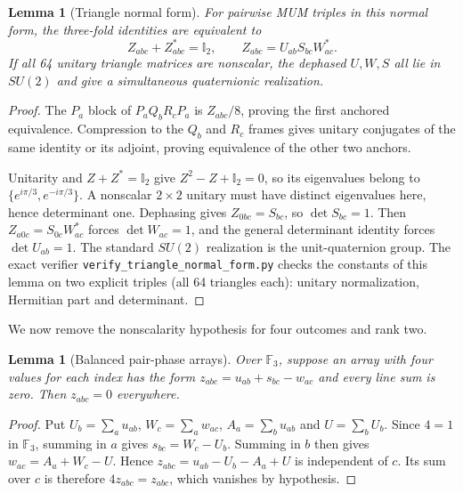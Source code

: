 \documentclass[11pt]{article}
\newtheorem{lemma}[theorem]{Lemma}
\newcommand{\id}{\mathbb I}
\begin{document}
\begin{lemma}[Triangle normal form]\label{lem:triangle}
For pairwise MUM triples in this normal form, the three-fold identities
are equivalent to
\[
 Z_{abc}+Z_{abc}^*=\id_2,
 \qquad Z_{abc}=U_{ab}S_{bc}W_{ac}^*.
\]
If all 64 unitary triangle matrices are nonscalar, the dephased
$U,W,S$ all lie in $SU(2)$ and give a simultaneous quaternionic
realization. 
\end{lemma}
\begin{proof}
The $P_a$ block of $P_aQ_bR_cP_a$ is $Z_{abc}/8$, proving the
first anchored equivalence. Compression to the $Q_b$ and $R_c$ frames
gives unitary conjugates of the same identity or its adjoint, proving
equivalence of the other two anchors.

Unitarity and $Z+Z^*=\id_2$ give $Z^2-Z+\id_2=0$, so its eigenvalues
belong to $\{e^{i\pi/3},e^{-i\pi/3}\}$. A nonscalar $2\times2$
unitary must have distinct eigenvalues here, hence determinant one.
Dephasing gives $Z_{0bc}=S_{bc}$, so $\det S_{bc}=1$.
Then $Z_{a0c}=S_{0c}W_{ac}^*$ forces $\det W_{ac}=1$, and the
general determinant identity forces $\det U_{ab}=1$. The standard
$SU(2)$ realization is the unit-quaternion group. The exact verifier
\texttt{verify\_triangle\_normal\_form.py} checks the constants of this
lemma on two explicit triples (all 64 triangles each): unitary
normalization, Hermitian part and determinant.
\end{proof}

We now remove the nonscalarity hypothesis for four outcomes and rank two.

\begin{lemma}[Balanced pair-phase arrays]\label{lem:phasearray}
Over $\mathbb F_3$, suppose an array with four values for each index has
the form $z_{abc}=u_{ab}+s_{bc}-w_{ac}$ and every line sum is zero.
Then $z_{abc}=0$ everywhere.
\end{lemma}
\begin{proof}
Put $U_b=\sum_a u_{ab}$, $W_c=\sum_a w_{ac}$,
$A_a=\sum_b u_{ab}$ and $U=\sum_b U_b$.
Since $4=1$ in $\mathbb F_3$, summing in $a$ gives
$s_{bc}=W_c-U_b$. Summing in $b$ then gives
$w_{ac}=A_a+W_c-U$.
Hence $z_{abc}=u_{ab}-U_b-A_a+U$ is independent of $c$.
Its sum over $c$ is therefore $4z_{abc}=z_{abc}$, which vanishes by
hypothesis.
\end{proof}
\end{document}
